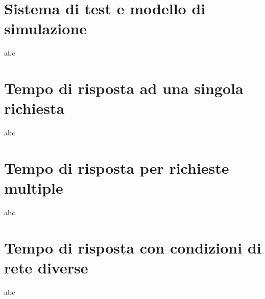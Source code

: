 \section{Sistema di test e modello di simulazione}

abc

\section{Tempo di risposta ad una singola richiesta}

abc

\section{Tempo di risposta per richieste multiple}

abc

\section{Tempo di risposta con condizioni di rete diverse}

abc